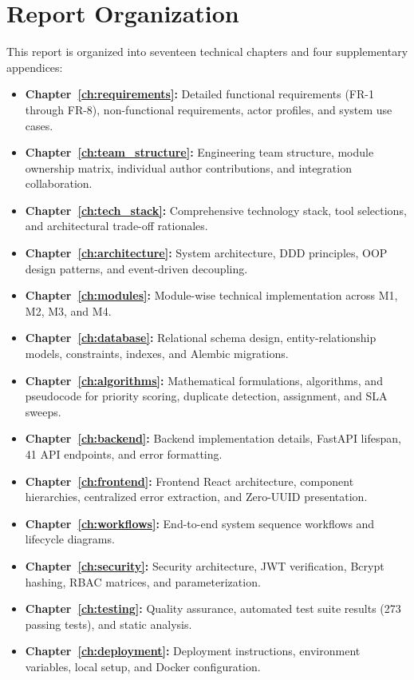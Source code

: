 \documentclass[11pt,a4paper,oneside]{report}
\begin{document}
\section{Report Organization}
\label{sec:intro_org}
This report is organized into seventeen technical chapters and four supplementary appendices:
\begin{itemize}
    \item \textbf{Chapter~\ref{ch:requirements}:} Detailed functional requirements (FR-1 through FR-8), non-functional requirements, actor profiles, and system use cases.
    \item \textbf{Chapter~\ref{ch:team_structure}:} Engineering team structure, module ownership matrix, individual author contributions, and integration collaboration.
    \item \textbf{Chapter~\ref{ch:tech_stack}:} Comprehensive technology stack, tool selections, and architectural trade-off rationales.
    \item \textbf{Chapter~\ref{ch:architecture}:} System architecture, DDD principles, OOP design patterns, and event-driven decoupling.
    \item \textbf{Chapter~\ref{ch:modules}:} Module-wise technical implementation across M1, M2, M3, and M4.
    \item \textbf{Chapter~\ref{ch:database}:} Relational schema design, entity-relationship models, constraints, indexes, and Alembic migrations.
    \item \textbf{Chapter~\ref{ch:algorithms}:} Mathematical formulations, algorithms, and pseudocode for priority scoring, duplicate detection, assignment, and SLA sweeps.
    \item \textbf{Chapter~\ref{ch:backend}:} Backend implementation details, FastAPI lifespan, 41 API endpoints, and error formatting.
    \item \textbf{Chapter~\ref{ch:frontend}:} Frontend React architecture, component hierarchies, centralized error extraction, and Zero-UUID presentation.
    \item \textbf{Chapter~\ref{ch:workflows}:} End-to-end system sequence workflows and lifecycle diagrams.
    \item \textbf{Chapter~\ref{ch:security}:} Security architecture, JWT verification, Bcrypt hashing, RBAC matrices, and parameterization.
    \item \textbf{Chapter~\ref{ch:testing}:} Quality assurance, automated test suite results (273 passing tests), and static analysis.
    \item \textbf{Chapter~\ref{ch:deployment}:} Deployment instructions, environment variables, local setup, and Docker configuration.

\end{itemize}
\end{document}
